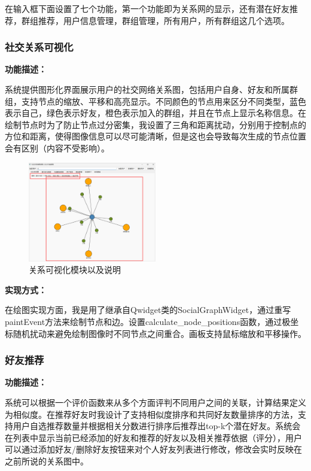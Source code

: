 \documentclass[12pt,a4paper]{article}
\begin{document}
在输入框下面设置了七个功能，第一个功能即为关系网的显示，还有潜在好友推荐，群组推荐，用户信息管理，群组管理，所有用户，所有群组这几个选项。

\subsubsection{社交关系可视化}

\noindent\textbf{功能描述：}

系统提供图形化界面展示用户的社交网络关系图，包括用户自身、好友和所属群组，支持节点的缩放、平移和高亮显示。不同颜色的节点用来区分不同类型，蓝色表示自己，绿色表示好友，橙色表示加入的群组，并且在节点上显示名称信息。在绘制节点时为了防止节点过分密集，我设置了三角和距离扰动，分别用于控制点的方位和距离，使得图像信息可以尽可能清晰，但是这也会导致每次生成的节点位置会有区别（内容不受影响）。

\begin{figure}[H]
    \centering
    \includegraphics[width=0.5\textwidth]{pt2-2.png}
    \caption{关系可视化模块以及说明}
\end{figure}

\noindent\textbf{实现方式：}

在绘图实现方面，我是用了继承自Qwidget类的SocialGraphWidget，通过重写paintEvent方法来绘制节点和边。设置calculate\_node\_positions函数，通过极坐标随机扰动来避免绘制图像时不同节点之间重合。画板支持鼠标缩放和平移操作。

\subsubsection{好友推荐}

\noindent\textbf{功能描述：}

系统可以根据一个评价函数来从多个方面评判不同用户之间的关联，计算结果定义为相似度。在推荐好友时我设计了支持相似度排序和共同好友数量排序的方法，支持用户自选推荐数量并根据相关分数进行排序后推荐出top-k个潜在好友。系统会在列表中显示当前已经添加的好友和推荐的好友以及相关推荐依据（评分），用户可以通过添加好友/删除好友按钮来对个人好友列表进行修改，修改会实时反映在之前所说的关系图中。
\end{document}
